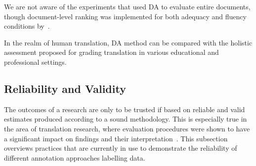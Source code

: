 %

We are not aware of the experiments that used DA to evaluate entire documents, though document-level ranking was implemented for both adequacy and fluency conditions by~\citet{Laubli2018}. 

In the realm of human translation, DA method can be compared with the holistic assessment proposed for grading translation in various educational and professional settings.


\subsection{\label{ssec:relval}Reliability and Validity}
The outcomes of a research are only to be trusted if based on reliable and valid estimates produced according to a sound methodology. This is especially true in the area of translation research, where evaluation procedures were shown to have a significant impact on findings and their interpretation~\cite{Laubli2020}. This subsection overviews practices that are currently in use to demonstrate the reliability of different annotation approaches labelling data. 


